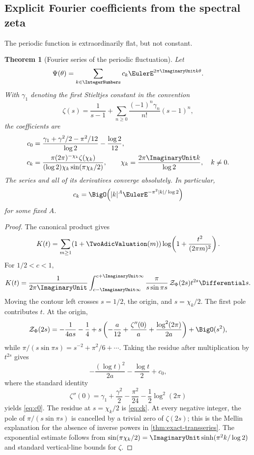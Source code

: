 \documentclass[11pt,oneside]{article}
\newtheorem{theorem}{Theorem}[section]
\theoremstyle{definition}
\theoremstyle{remark}
\begin{document}
\subsection{Explicit Fourier coefficients from the spectral zeta}

The periodic function is extraordinarily flat, but not constant.

\begin{theorem}[Fourier series of the periodic fluctuation]
\label{thm:Psi-Fourier}
Let
\[
 \Psi(\theta)=\sum_{k\in\IntegerNumbers}c_k\EulerE^{2\pi\ImaginaryUnit k\theta}.
\]
With \(\gamma_1\) denoting the first Stieltjes constant in the convention
\[
 \zeta(s)=\frac1{s-1}
 +\sum_{n\geq0}\frac{(-1)^n\gamma_n}{n!}(s-1)^n,
\]
the coefficients are
\begin{align}
 c_0
 &=
 \frac{\gamma_1+\gamma^2/2-\pi^2/12}{\log2}
 -\frac{\log2}{12},
 \label{eq:c0}\\
 c_k
 &=
 \frac{\pi(2\pi)^{-\chi_k}\zeta(\chi_k)}
      {(\log2)\chi_k\sin(\pi\chi_k/2)},
 \qquad
 \chi_k=\frac{2\pi\ImaginaryUnit k}{\log2},
 \quad k\neq0.
 \label{eq:ck}
\end{align}
The series and all of its derivatives converge absolutely.  In particular,
\[
 c_k=\BigO\!\left(
  |k|^A\EulerE^{-\pi^2|k|/\log2}
 \right)
\]
for some fixed \(A\).
\end{theorem}

\begin{proof}
The canonical product gives
\[
 K(t)=\sum_{m\geq1}(1+\TwoAdicValuation(m))
       \log\!\left(1+\frac{t^2}{(2\pi m)^2}\right).
\]
For \(1/2<c<1\),
\[
 K(t)=\frac1{2\pi\ImaginaryUnit}\int_{c-\ImaginaryUnit\infty}^{c+\ImaginaryUnit\infty}
 \frac{\pi}{s\sin\pi s}\,
 \mathcal Z_\Phi(2s)t^{2s}\Differential s.
 \label{eq:K-Mellin}
\]
Moving the contour left crosses \(s=1/2\), the origin, and
\(s=\chi_k/2\).  The first pole contributes \(t\).  At the origin,
\[
 \mathcal Z_\Phi(2s)
 =-\frac1{4as}-\frac14
 +s\left(
   -\frac a{12}
   +\frac{\zeta''(0)}a
   +\frac{\log^2(2\pi)}{2a}
  \right)+\BigO(s^2),
\]
while
\(\pi/(s\sin\pi s)=s^{-2}+\pi^2/6+\cdots\).
Taking the residue after multiplication by \(t^{2s}\) gives
\[
 -\frac{(\log t)^2}{2a}-\frac{\log t}{2}+c_0,
\]
where the standard identity
\[
 \zeta''(0)
 =\gamma_1+\frac{\gamma^2}{2}
  -\frac{\pi^2}{24}
  -\frac12\log^2(2\pi)
\]
yields \eqref{eq:c0}.  The residue at \(s=\chi_k/2\) is
\eqref{eq:ck}.  At every negative integer, the pole of
\(\pi/(s\sin\pi s)\) is cancelled by a trivial zero of
\(\zeta(2s)\); this is the Mellin explanation for the absence of inverse
powers in \cref{thm:exact-transseries}.  The exponential estimate follows
from
\(\sin(\pi\chi_k/2)=\ImaginaryUnit\sinh(\pi^2k/\log2)\) and standard vertical-line
bounds for \(\zeta\).
\end{proof}
\end{document}

